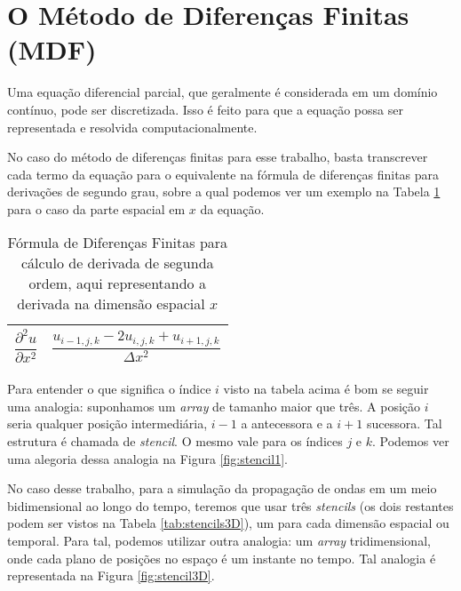 \section{O Método de Diferenças Finitas (MDF)}

	Uma equação diferencial parcial, que geralmente é considerada em um domínio 
	contínuo, pode ser discretizada. Isso é feito para que a equação possa ser 
	representada e resolvida computacionalmente. 
	
	No caso do método de diferenças	finitas para esse trabalho, basta 
	transcrever cada termo da equação para o equivalente na fórmula de 
	diferenças finitas para derivações de segundo grau, sobre a qual podemos 
	ver um exemplo na Tabela \ref{tab:stencil1D} para o caso da parte espacial em $x$ da equação. 
	\begin{table}[H]
		\caption{Fórmula de Diferenças Finitas para cálculo de derivada de segunda ordem, aqui representando a derivada na dimensão espacial $x$}
		\centering
		\begin{tabular}{c|c}
			\hline
			$\dfrac{\partial^2 u}{\partial x^2}$ & $\dfrac{u_{i-1,j,k} - 2u_{i,j,k} + 
				u_{i+1,j,k}}{\Delta x^2}$ \\ \hline
		\end{tabular}
		\label{tab:stencil1D}
	\end{table}
	
	
	Para entender o que 
	significa o índice $i$ visto na tabela acima é bom se seguir uma analogia: 
	suponhamos um \textit{array} de tamanho maior que três. A posição $i$ seria 
	qualquer posição intermediária, $i-1$ a antecessora e a $i+1$ sucessora. Tal 
	estrutura é chamada de \textit{stencil}. O mesmo vale para os índices
	$j$ e $k$. Podemos ver uma alegoria dessa 
	analogia na Figura \ref{fig:stencil1}.
	
	
	No caso desse trabalho, para a simulação da propagação de ondas em um 
	meio bidimensional ao longo do tempo, teremos que usar três 
	\textit{stencils} (os dois restantes podem ser vistos na Tabela 
	\ref{tab:stencils3D}), um para cada dimensão espacial ou temporal. Para tal, 
	podemos utilizar outra analogia: um \textit{array} tridimensional, onde cada
	plano de posições no espaço é um instante no tempo. Tal analogia é representada 
	na Figura \ref{fig:stencil3D}.
	
